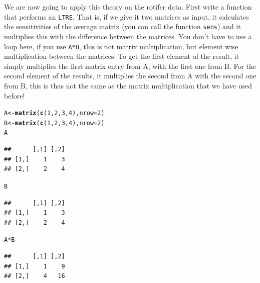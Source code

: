 \documentclass{article}\usepackage[]{graphicx}\usepackage[]{color}
\makeatletter
\newcommand{\hlnum}[1]{\textcolor[rgb]{0.686,0.059,0.569}{#1}}%
\newcommand{\hlopt}[1]{\textcolor[rgb]{0,0,0}{#1}}%
\newcommand{\hlstd}[1]{\textcolor[rgb]{0.345,0.345,0.345}{#1}}%
\newcommand{\hlkwb}[1]{\textcolor[rgb]{0.69,0.353,0.396}{#1}}%
\newcommand{\hlkwc}[1]{\textcolor[rgb]{0.333,0.667,0.333}{#1}}%
\newcommand{\hlkwd}[1]{\textcolor[rgb]{0.737,0.353,0.396}{\textbf{#1}}}%
\newenvironment{kframe}{%
 \def\at@end@of@kframe{}%
 \ifinner\ifhmode%
  \def\at@end@of@kframe{\end{minipage}}%
  \begin{minipage}{\columnwidth}%
 \fi\fi%
 \def\FrameCommand##1{\hskip\@totalleftmargin \hskip-\fboxsep
 \colorbox{shadecolor}{##1}\hskip-\fboxsep
     \hskip-\linewidth \hskip-\@totalleftmargin \hskip\columnwidth}%
 \MakeFramed {\advance\hsize-\width
   \@totalleftmargin\z@ \linewidth\hsize
   \@setminipage}}%
 {\par\unskip\endMakeFramed%
 \at@end@of@kframe}
\newenvironment{knitrout}{}{} %
\makeatother
\begin{document}
We are now going to apply this theory on the rotifer data. First write a function that performs an \texttt{LTRE}. That is, if we give it two matrices as input, it calculates the sensitivities of the average matrix (you can call the function \texttt{sens}) and it multiplies this with the difference between the matrices. You don't have to use a loop here, if you use \texttt{A*B}, this is not matrix multiplication, but element wise multiplication between the matrices. To get the first element of the result, it simply multiplies the first matrix entry from A, with the first one from B. For the second element of the results, it multiplies the second from A with the second one from B, this is thus not the same as the matrix multiplication that we have used before!
\begin{knitrout}
\color{fgcolor}\begin{kframe}
\begin{alltt}
\hlstd{A} \hlkwb{<-} \hlkwd{matrix}\hlstd{(}\hlkwd{c}\hlstd{(}\hlnum{1}\hlstd{,}\hlnum{2}\hlstd{,}\hlnum{3}\hlstd{,}\hlnum{4}\hlstd{),}\hlkwc{nrow}\hlstd{=}\hlnum{2}\hlstd{)}
\hlstd{B} \hlkwb{<-} \hlkwd{matrix}\hlstd{(}\hlkwd{c}\hlstd{(}\hlnum{1}\hlstd{,}\hlnum{2}\hlstd{,}\hlnum{3}\hlstd{,}\hlnum{4}\hlstd{),}\hlkwc{nrow}\hlstd{=}\hlnum{2}\hlstd{)}
\hlstd{A}
\end{alltt}
\begin{verbatim}
##      [,1] [,2]
## [1,]    1    3
## [2,]    2    4
\end{verbatim}
\begin{alltt}
\hlstd{B}
\end{alltt}
\begin{verbatim}
##      [,1] [,2]
## [1,]    1    3
## [2,]    2    4
\end{verbatim}
\begin{alltt}
\hlstd{A}\hlopt{*}\hlstd{B}
\end{alltt}
\begin{verbatim}
##      [,1] [,2]
## [1,]    1    9
## [2,]    4   16
\end{verbatim}
\end{kframe}
\end{knitrout}
\end{document}
